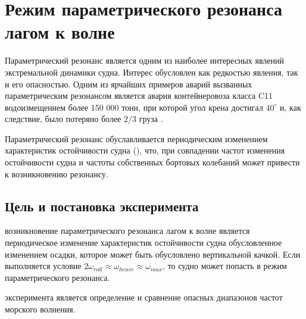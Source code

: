 \section{Режим параметрического резонанса лагом к волне}

Параметрический резонанс является одним из наиболее интересных явлений экстремальной динамики судна.
Интерес обусловлен как редкостью явления, так и его опасностью. 
Одним из ярчайших примеров аварий вызванных параметрическим резонансом является 
авария контейнеровоза класса C11 водоизмещением более 150 000 тонн, при которой 
угол крена достигал $40^{\circ}$ и, как следствие, было потеряно более $2/3$ 
груза \citep{c11}.

Параметрический резонанс обуславливается периодическим изменением характеристик остойчивости судна (), что, при совпадении частот изменения остойчивости судна  и частоты собственных 
бортовых колебаний может привести к возникновению резонансу. 



\subsection{Цель и постановка эксперимента}

 возникновение параметрического резонанса  лагом к волне является периодическое изменение характеристик остойчивости судна обусловленное изменением осадки, которое может быть обусловлено вертикальной качкой. Если выполняется условие $2 \omega_{roll} \approx \omega_{heave} \approx \omega_{max}$, то судно может попасть в режим параметрического резонанса.

 эксперимента является определение и сравнение опасных диапазонов частот морского волнения.

